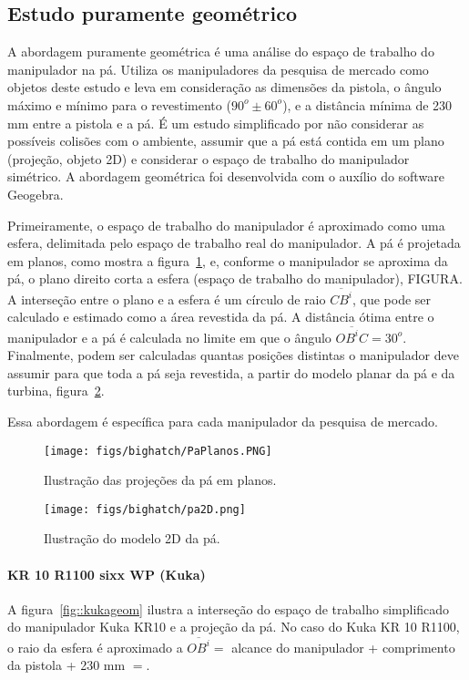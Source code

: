 \subsection{Estudo puramente geométrico}
A abordagem puramente geométrica é uma análise do espaço de trabalho do
manipulador na pá. Utiliza os manipuladores da pesquisa de mercado como
objetos deste estudo e leva em consideração as dimensões da
pistola, o ângulo máximo e mínimo para o revestimento ($90^o \pm 60^o$), e a
distância mínima de 230 mm entre a pistola e a pá. É um estudo simplificado por não considerar as possíveis colisões com o ambiente, assumir
que a pá está contida em um plano (projeção, objeto 2D) e considerar o espaço
de trabalho do manipulador simétrico. A abordagem geométrica foi desenvolvida
com o auxílio do software Geogebra.

Primeiramente, o espaço de trabalho do manipulador é aproximado
como uma esfera, delimitada pelo espaço de
trabalho real do manipulador. A pá é projetada em planos, como mostra a
figura~\ref{fig::paplanos}, e, conforme o manipulador se aproxima da pá, o plano
direito corta a esfera (espaço de trabalho do manipulador), FIGURA. A interseção
entre o plano e a esfera é um círculo de raio $\overline{CB^i}$, que pode ser
calculado e estimado como a área revestida da pá. A distância ótima entre o
manipulador e a pá é calculada no limite em que o ângulo
$\overline{OB^iC}=30^o$. Finalmente, podem ser calculadas quantas posições
distintas o manipulador deve assumir para que toda a pá seja revestida, a partir
do modelo planar da pá e da turbina, figura~\ref{fig::pa2D}.

Essa abordagem é específica para cada manipulador da pesquisa de mercado.

\begin{figure}[h!]	
	\texttt{[image: figs/bighatch/PaPlanos.PNG]}
	\caption{Ilustração das projeções da pá em planos.}
	\label{fig::paplanos}
\end{figure}

\begin{figure}[h!]	
	\texttt{[image: figs/bighatch/pa2D.png]}
	\caption{Ilustração do modelo 2D da pá.}
	\label{fig::pa2D}
\end{figure}

\paragraph{KR 10 R1100 sixx WP (Kuka)}
A figura~\ref{fig::kukageom} ilustra a interseção do espaço de trabalho
simplificado do manipulador Kuka KR10 e a projeção da pá. No
caso do Kuka KR 10 R1100, o raio da esfera é aproximado a $\overline{OB^i} = $
alcance do manipulador + comprimento da pistola + 230 mm $= $. 

